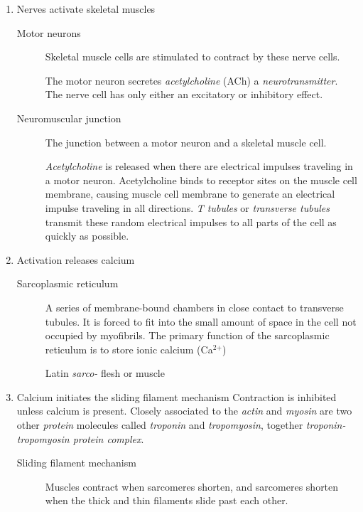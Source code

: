 \documentclass[11pt]{article}
\begin{document}
\begin{enumerate}
\item Nerves activate skeletal muscles
\label{sec:orgc6d1416}
\begin{description}
\item[{Motor neurons}] Skeletal muscle cells are stimulated to contract by
these nerve cells.

The motor neuron secretes \emph{acetylcholine} (ACh) a \emph{neurotransmitter}.
The nerve cell has only either an excitatory or inhibitory effect.

\item[{Neuromuscular junction}] The junction between a motor neuron and a
skeletal muscle cell.

\emph{Acetylcholine} is released when there are electrical impulses
traveling in a motor neuron. Acetylcholine binds to receptor sites on
the muscle cell membrane, causing muscle cell membrane to generate an
electrical impulse traveling in all directions. \emph{T tubules} or
\emph{transverse tubules} transmit these random electrical impulses to all
parts of the cell as quickly as possible.
\end{description}

\item Activation releases calcium
\label{sec:org5d2a84a}
\begin{description}
\item[{Sarcoplasmic reticulum}] A series of membrane-bound chambers in close
contact to transverse tubules. It is forced to fit into the small
amount of space in the cell not occupied by myofibrils. The primary
function of the sarcoplasmic reticulum is to store ionic calcium
(Ca\(^{\text{2+}}\))

Latin \emph{sarco-} flesh or muscle
\end{description}

\item Calcium initiates the sliding filament mechanism
\label{sec:org93dee8e}
Contraction is inhibited unless calcium is present. Closely associated to
the \emph{actin} and \emph{myosin} are two other \emph{protein} molecules called
\emph{troponin} and \emph{tropomyosin}, together \emph{troponin-tropomyosin protein
complex}. 

\begin{description}
\item[{Sliding filament mechanism}] Muscles contract when sarcomeres shorten,
and sarcomeres shorten when the thick and thin filaments slide past
each other.
\end{description}
\end{enumerate}
\end{document}
